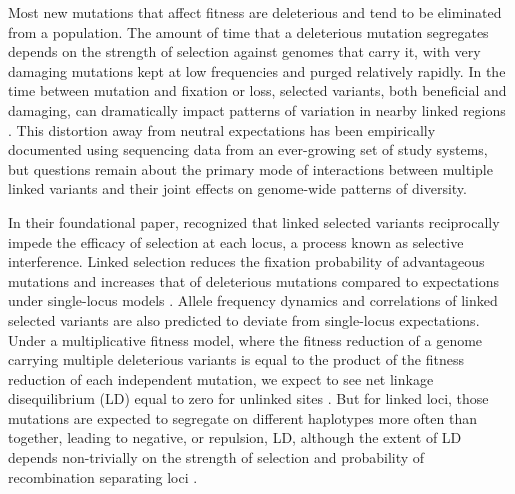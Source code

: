 \documentclass[]{article}
\begin{document}
Most new mutations that affect fitness are deleterious and tend to be
eliminated from a population. The amount of time that a deleterious mutation
segregates depends on the strength of selection against genomes that carry it,
with very damaging mutations kept at low frequencies and purged relatively
rapidly. In the time between mutation and fixation or loss, selected variants,
both beneficial and damaging, can dramatically impact patterns of variation in
nearby linked regions \citep[e.g.][]{Smith1974-em,Charlesworth1995-dq,Kim2000-on}.
This distortion away from neutral expectations has been empirically documented
using sequencing data from an ever-growing set of study systems, but questions
remain about the primary mode of interactions between multiple linked variants
and their joint effects on genome-wide patterns of diversity.

In their foundational paper, \citet{Hill1966-gv} recognized that linked
selected variants reciprocally impede the efficacy of selection at each locus,
a process known as selective interference. Linked selection reduces the
fixation probability of advantageous mutations and increases that of
deleterious mutations compared to expectations under single-locus models
\citep{Birky1988-jm}. Allele frequency dynamics and correlations of linked
selected variants are also predicted to deviate from single-locus expectations.
Under a multiplicative fitness model, where the fitness reduction of a genome
carrying multiple deleterious variants is equal to the product of the fitness
reduction of each independent mutation, we expect to see net linkage
disequilibrium (LD) equal to zero for unlinked sites \citep{Kondrashov1995-va}.
But for linked loci, those mutations are expected to segregate on different
haplotypes more often than together, leading to negative, or repulsion, LD,
although the extent of LD depends non-trivially on the strength of selection
and probability of recombination separating loci
\citep{Hill1966-gv,McVean2000-ox}.
\end{document}
